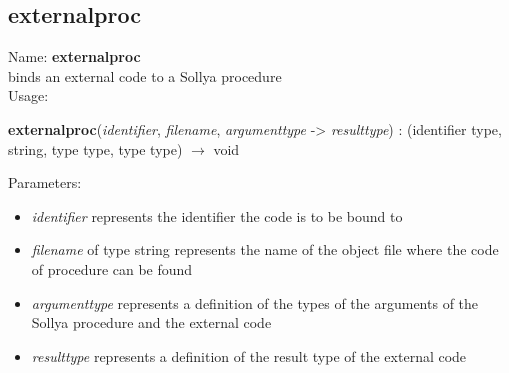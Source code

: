 \subsection{ externalproc }
\noindent Name: \textbf{externalproc}\\
binds an external code to a Sollya procedure\\

\noindent Usage: 
\begin{center}
\textbf{externalproc}(\emph{identifier}, \emph{filename}, \emph{argumenttype} -> \emph{resulttype}) : (\textsf{identifier type}, \textsf{string}, \textsf{type type}, \textsf{type type}) $\rightarrow$ \textsf{void}\\
\end{center}
Parameters: 
\begin{itemize}
\item \emph{identifier} represents the identifier the code is to be bound to
\item \emph{filename} of type \textsf{string} represents the name of the object file where the code of procedure can be found
\item \emph{argumenttype} represents a definition of the types of the arguments of the Sollya procedure and the external code
\item \emph{resulttype} represents a definition of the result type of the external code
\end{itemize}
